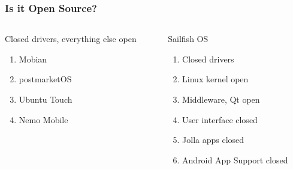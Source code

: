\documentclass[
	notes=none,
	aspectratio=169
]{beamer}
\begin{document}
\begin{frame}
\frametitle{Is it Open Source?}

\begin{columns}[T]
\begin{column}[T]{0.5\textwidth}
\setlength{\parskip}{0.5em}

\vspace{0.4cm}
Closed drivers, everything else open
\begin{enumerate}
\setlength{\parskip}{0.5em}
\item Mobian
\item postmarketOS
\item Ubuntu Touch
\item Nemo Mobile
\end{enumerate}

\end{column}
\begin{column}[T]{0.5\textwidth}
\setlength{\parskip}{0.5em}

\vspace{0.4cm}
Sailfish OS
\begin{enumerate}
\setlength{\parskip}{0.5em}
\item Closed drivers
\item Linux kernel open
\item Middleware, Qt open
\item User interface closed
\item Jolla apps closed
\item Android App Support closed
\end{enumerate}

\end{column}
\end{columns}

\end{frame}
\note{
}

\end{document}

